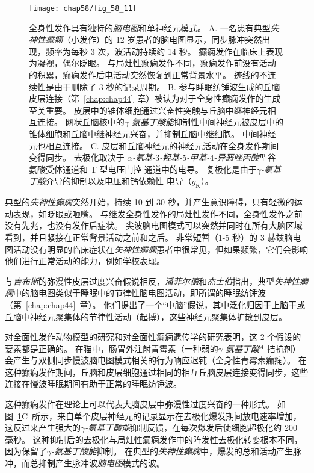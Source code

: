 \begin{figure}[htbp]
	\centering
	\texttt{[image: chap58/fig\_58\_11]}
	\caption{全身性发作具有独特的\textit{脑电图}和单神经元模式。
		A. 一名患有典型\textit{失神性癫痫}（小发作）的 12 岁患者的脑电图显示，同步脉冲突然出现，频率为每秒 3 次，波活动持续约 14 秒。
		癫痫发作在临床上表现为凝视，偶尔眨眼。
		与局灶性癫痫发作不同，癫痫发作前没有活动的积累，癫痫发作后电活动突然恢复到正常背景水平。
		迹线的不连续性是由于删除了 3 秒的记录周期\cite{lothman1990seizures}。
		B. 参与睡眠纺锤波生成的丘脑皮层连接（第~\ref{chap:chap44}~章）被认为对于全身性癫痫发作的生成至关重要。
		皮层中的锥体细胞通过兴奋性突触与丘脑中继神经元相互连接。
		网状丘脑核中的\textit{$\gamma$-氨基丁酸能}抑制性中间神经元被皮层中的锥体细胞和丘脑中继神经元兴奋，并抑制丘脑中继细胞。
		中间神经元也相互连接。 
		C. 皮层和丘脑神经元的神经元活动在全身发作期间变得同步。
		去极化取决于 \textit{$\alpha$-氨基-}3\textit{-羟基-}5\textit{-甲基-}4\textit{-异恶唑丙酸}型谷氨酸受体通道和 T 型电压门控  通道中的电导。
		复极化是由于\textit{$\gamma$-氨基丁酸}介导的抑制以及电压和钙依赖性  电导（$ g_\text{K} $）\cite{lothman1993neurobiology}。}
	\label{fig:58_11}
\end{figure}


典型的\textit{失神性癫痫}突然开始，持续 10 到 30 秒，并产生意识障碍，只有轻微的运动表现，如眨眼或咂嘴。
与继发全身性发作的局灶性发作不同，全身性发作之前没有先兆，也没有发作后症状。
尖波脑电图模式可以突然并同时在所有大脑区域看到，并且紧接在正常背景活动之前和之后。
非常短暂（1-5 秒）的 3 赫兹脑电图活动没有明显的临床症状在\textit{失神性癫痫}患者中很常见，但如果频繁，它们会影响他们进行正常活动的能力，例如学校表现。


与\textit{吉布斯}的弥漫性皮层过度兴奋假说相反，\textit{潘菲尔德}和\textit{杰士伯}指出，典型\textit{失神性癫痫}中的脑电图类似于睡眠中的节律性脑电图活动，即所谓的睡眠纺锤波（第~\ref{chap:chap44}~章）。
他们提出了一个“中脑”假说，其中泛化归因于上脑干或丘脑中神经元聚集体的节律性活动（起搏），这些神经元聚集体扩散到皮层。


对全面性发作动物模型的研究和对全面性癫痫遗传学的研究表明，这 2 个假设的要素都是正确的。
在猫中，肠胃外注射青霉素（一种弱的\textit{$\gamma$-氨基丁酸}$^A$ 拮抗剂）会产生与双侧同步慢波脑电图模式相关的行为响应迟钝（全身性青霉素癫痫）。
在这种癫痫发作期间，丘脑和皮层细胞通过相同的相互丘脑皮层连接变得同步，这些连接在慢波睡眠期间有助于正常的睡眠纺锤波。


这种癫痫发作在理论上可以代表大脑皮层中弥漫性过度兴奋的一种形式。
如图~\ref{fig:58_11}C~所示，来自单个皮层神经元的记录显示在去极化爆发期间放电速率增加，这反过来产生强大的\textit{$\gamma$-氨基丁酸能}抑制反馈，在每次爆发后使细胞超极化约 200 毫秒。
这种抑制后的去极化与局灶性癫痫发作中的阵发性去极化转变根本不同，因为保留了\textit{$\gamma$-氨基丁酸能}抑制。
在典型的\textit{失神性癫痫}中，爆发的总和活动产生脉冲，而总抑制产生脉冲波\textit{脑电图}模式的波。


